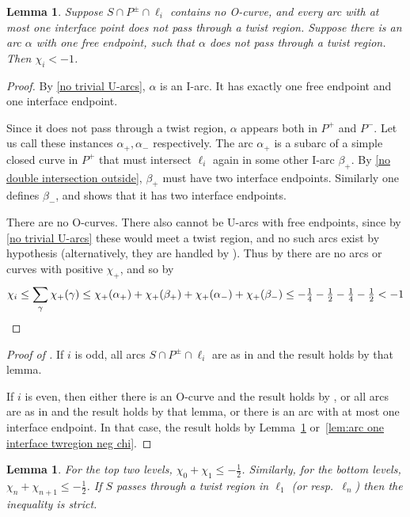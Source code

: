 \documentclass[12pt,reqno]{amsart}
\theoremstyle{plain}
\newtheorem{lemma}[theorem]{Lemma}
\theoremstyle{definition}
\begin{document}
\begin{lemma}\label{lem:arc one interface neg chi}
Suppose $S\cap P^{\pm} \cap \ell_i$ contains no O-curve, and every arc with at most one 
interface point does not pass through a twist region. Suppose there is an arc $\alpha$ 
with one free endpoint, such that $\alpha$ does not pass through a twist region. 
Then $\chi_i <-1$. 
\end{lemma}

\begin{proof}
By \ref{no trivial U-arcs}, $\alpha$ is an I-arc. It has exactly one free endpoint and one 
interface endpoint. 

Since it does not pass through a twist region, $\alpha$ appears both in $P^+$ and $P^-$. 
Let us call these instances $\alpha_+,\alpha_-$ respectively. The arc $\alpha_+$ is 
a subarc of a simple closed curve in $P^+$ that must intersect $\ell_i$ again 
in some other I-arc $\beta_+$. By \ref{no double intersection outside}, $\beta_+$ 
must have two interface endpoints. Similarly one defines $\beta_-$, and shows 
that it has two interface endpoints. 

There are no O-curves. There also cannot be U-arcs with free endpoints, since 
by \ref{no trivial U-arcs} these would meet a twist region, and no such arcs exist by 
hypothesis (alternatively, they are handled by ). 
Thus by  there are no arcs or curves with positive $\chi_+$, 
and so by 
\[ \chi_i\le \sum_{\gamma}\chi_+(\gamma) \le\chi_+(\alpha_+) + \chi_+(\beta_+) + 
    \chi_+(\alpha_-)+\chi_+(\beta_-) \le -\tfrac14 -\tfrac12 -\tfrac14 -\tfrac12 <-1 \qedhere \]
\end{proof}

\begin{proof}[Proof of ]
If $i$ is odd, all arcs $S\cap P^{\pm} \cap \ell_i$ are as in  and the result holds by that lemma. 

If $i$ is even, then either there is an O-curve and the result holds by 
, or all arcs are as in  
and the result holds by that lemma, or there is an arc with at most one interface 
endpoint. In that case, the result holds by Lemma~\ref{lem:arc one interface neg chi}
or~\ref{lem:arc one interface twregion neg chi}. 
\end{proof}

\begin{lemma}\label{inequality for top and bottom}
For the top two levels, $\chi_0+\chi_1\le -\tfrac12$. Similarly, for the 
bottom levels, $\chi_n+\chi_{n+1}\le -\tfrac12$. 
If $S$ passes through a twist region in 
$\ell_1$ (or resp.\ $\ell_n$) then the inequality is strict.
\end{lemma}
\end{document}

